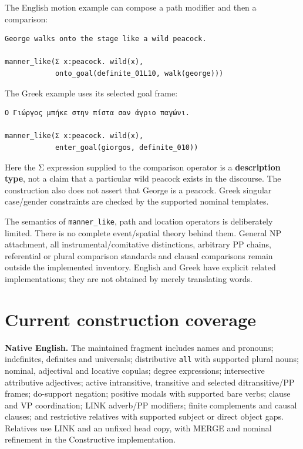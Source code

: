 \documentclass[11pt,a4paper]{article}
\begin{document}
The English motion example can compose a path modifier and then a
comparison:

\begin{Verbatim}[fontsize=\small,breaklines=true,breakanywhere=true,commandchars=\\\{\},frame=single,rulecolor=\color{DSmuted},framesep=5pt]
George walks onto the stage like a wild peacock.

manner_like(Σ x:peacock. wild(x),
            onto_goal(definite_01L10, walk(george)))
\end{Verbatim}

The Greek example uses its selected goal frame:

\begin{Verbatim}[fontsize=\small,breaklines=true,breakanywhere=true,commandchars=\\\{\},frame=single,rulecolor=\color{DSmuted},framesep=5pt]
Ο Γιώργος μπήκε στην πίστα σαν άγριο παγώνι.

manner_like(Σ x:peacock. wild(x),
            enter_goal(giorgos, definite_010))
\end{Verbatim}

Here the Σ expression supplied to the comparison operator is a
\textbf{description type}, not a claim that a particular wild peacock
exists in the discourse. The construction also does not assert that
George is a peacock. Greek singular case/gender constraints are checked
by the supported nominal templates.

The semantics of \texttt{manner\_like}, path and location operators is
deliberately limited. There is no complete event/spatial theory behind
them. General NP attachment, all instrumental/comitative distinctions,
arbitrary PP chains, referential or plural comparison standards and
clausal comparisons remain outside the implemented inventory. English
and Greek have explicit related implementations; they are not obtained
by merely translating words.

\section{Current construction
coverage}\label{current-construction-coverage}

\textbf{Native English.} The maintained fragment includes names and
pronouns; indefinites, definites and universals; distributive
\texttt{all} with supported plural nouns; nominal, adjectival and
locative copulas; degree expressions; intersective attributive
adjectives; active intransitive, transitive and selected ditransitive/PP
frames; do-support negation; positive modals with supported bare verbs;
clause and VP coordination; LINK adverb/PP modifiers; finite complements
and causal clauses; and restrictive relatives with supported subject or
direct object gaps. Relatives use LINK and an unfixed head copy, with
MERGE and nominal refinement in the Constructive implementation.
\end{document}
